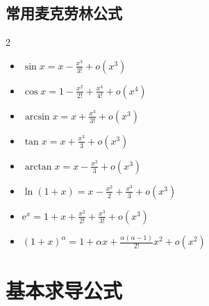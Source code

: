 \documentclass[lang=cn,math=mtpro2,10pt,scheme=chinese,black]{elegantbook}
\begin{document}
\subsection{常用麦克劳林公式}

\begin{multicols}{2}
\begin{itemize}
    \item \( \displaystyle \sin x = x - \frac{x^3}{3!} + o(x^{3}) \)
    \item \( \displaystyle \cos x = 1 - \frac{x^2}{2!} + \frac{x^4}{4!} + o(x^{4}) \)
    \item\( \displaystyle \arcsin x = x + \frac{x^3}{3!} + o(x^{3}) \)
    \item \( \displaystyle \tan x = x + \frac{x^3}{3} + o(x^{3}) \)
    \item \( \displaystyle \arctan x = x - \frac{x^3}{3} + o(x^{3}) \)
    \item \( \displaystyle \ln(1+x) = x - \frac{x^2}{2} + \frac{x^3}{3} + o(x^3) \)
    \item \( \displaystyle \mathrm{e}^x = 1 + x + \frac{x^2}{2!} + \frac{x^3}{3!} + o(x^3) \)
    \item \( \displaystyle (1+x)^\alpha = 1 + \alpha x + \frac{\alpha(\alpha-1)}{2!}x^2 +  o(x^2) \)
\end{itemize}
\end{multicols}

\section{基本求导公式}
\end{document}
